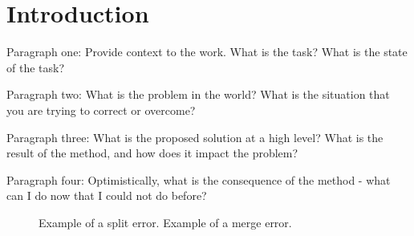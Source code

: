 \section{Introduction}

Paragraph one: Provide context to the work.
What is the task? What is the state of the task?

Paragraph two: What is the problem in the world? What is the situation that you are trying to correct or overcome?

Paragraph three: What is the proposed solution at a high level? What is the result of the method, and how does it impact the problem?

Paragraph four: Optimistically, what is the consequence of the method - what can I do now that I could not do before?

\begin{figure}
\caption{Example of a split error. Example of a merge error.}
\end{figure}